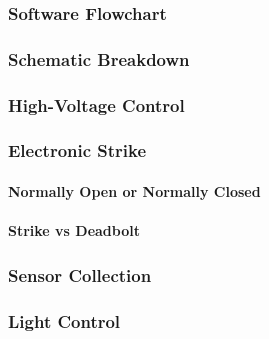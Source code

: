 \subsubsection{Software Flowchart}

\subsubsection{Schematic Breakdown}

\subsubsection{High-Voltage Control}

\subsubsection{Electronic Strike}

\paragraph{Normally Open or Normally Closed}

\paragraph{Strike vs Deadbolt}

\subsubsection{Sensor Collection}

\subsubsection{Light Control}

